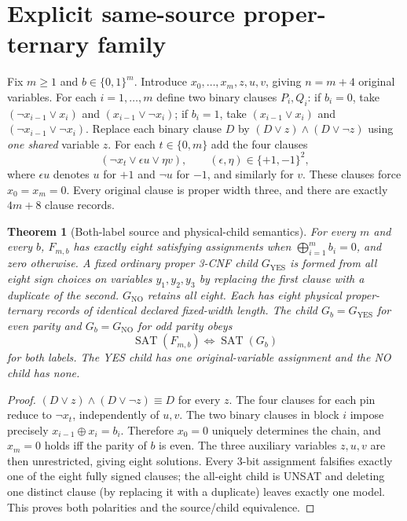\documentclass[11pt]{article}
\newtheorem{theorem}{Theorem}
\begin{document}
\section{Explicit same-source proper-ternary family}
Fix $m\ge1$ and $b\in\{0,1\}^m$. Introduce $x_0,\ldots,x_m,z,u,v$, giving $n=m+4$ original variables. For each $i=1,\ldots,m$ define two binary clauses $P_i,Q_i$: if $b_i=0$, take $(\neg x_{i-1}\vee x_i)$ and $(x_{i-1}\vee\neg x_i)$; if $b_i=1$, take $(x_{i-1}\vee x_i)$ and $(\neg x_{i-1}\vee\neg x_i)$. Replace each binary clause $D$ by $(D\vee z)\wedge(D\vee\neg z)$ using \emph{one shared} variable $z$. For each $t\in\{0,m\}$ add the four clauses
\[
(\neg x_t\vee \epsilon u\vee \eta v),\qquad
(\epsilon,\eta)\in\{+1,-1\}^2,
\]
where $\epsilon u$ denotes $u$ for $+1$ and $\neg u$ for $-1$, and similarly for $v$. These clauses force $x_0=x_m=0$. Every original clause is proper width three, and there are exactly $4m+8$ clause records.
\begin{theorem}[Both-label source and physical-child semantics]
For every $m$ and every $b$, $F_{m,b}$ has exactly eight satisfying assignments when $\bigoplus_{i=1}^m b_i=0$, and zero otherwise. A fixed ordinary proper 3-CNF child $G_{\mathrm{YES}}$ is formed from all eight sign choices on variables $y_1,y_2,y_3$ by replacing the first clause with a duplicate of the second. $G_{\mathrm{NO}}$ retains all eight. Each has eight physical proper-ternary records of identical declared fixed-width length. The child $G_b=G_{\mathrm{YES}}$ for even parity and $G_b=G_{\mathrm{NO}}$ for odd parity obeys
\[
\operatorname{SAT}(F_{m,b})\Longleftrightarrow\operatorname{SAT}(G_b)
\]
for \emph{both} labels. The YES child has one original-variable assignment and the NO child has none.
\end{theorem}
\begin{proof}
$(D\vee z)\wedge(D\vee\neg z)\equiv D$ for every $z$. The four clauses for each pin reduce to $\neg x_t$, independently of $u,v$. The two binary clauses in block $i$ impose precisely $x_{i-1}\oplus x_i=b_i$. Therefore $x_0=0$ uniquely determines the chain, and $x_m=0$ holds iff the parity of $b$ is even. The three auxiliary variables $z,u,v$ are then unrestricted, giving eight solutions. Every 3-bit assignment falsifies exactly one of the eight fully signed clauses; the all-eight child is UNSAT and deleting one distinct clause (by replacing it with a duplicate) leaves exactly one model. This proves both polarities and the source/child equivalence.
\end{proof}
\end{document}
